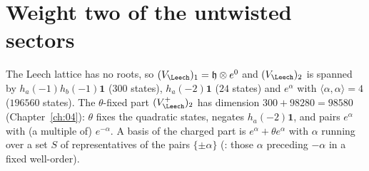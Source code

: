 \section{Weight two of the untwisted sectors}\label{ch11:sec:weighttwo}

The Leech lattice has no roots, so $(V_\Leech)_1=\mathfrak h\otimes e^0$ and $(V_\Leech)_2$ is
spanned by $h_a(-1)h_b(-1)\mathbf 1$ ($300$ states), $h_a(-2)\mathbf 1$ ($24$ states) and $e^\alpha$
with $\langle\alpha,\alpha\rangle=4$ ($196560$ states).  The $\theta$-fixed part $(V_\Leech^+)_2$ has
dimension $300+98280=98580$ (Chapter~\ref{ch:04}): $\theta$ fixes the quadratic states, negates
$h_a(-2)\mathbf 1$, and pairs $e^\alpha$ with (a multiple of) $e^{-\alpha}$.  A basis of the charged
part is $e^\alpha+\theta e^\alpha$ with $\alpha$ running over a set $S$ of representatives of the
pairs $\{\pm\alpha\}$ (: those $\alpha$ preceding $-\alpha$ in a fixed well-order).

